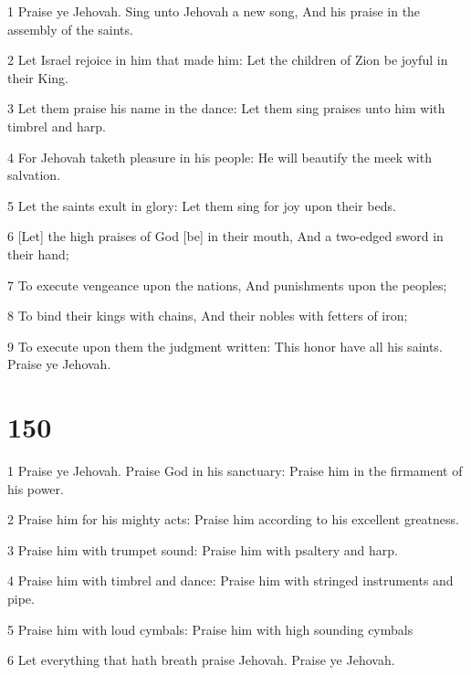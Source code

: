 \par 1 Praise ye Jehovah. Sing unto Jehovah a new song, And his praise in the assembly of the saints.
\par 2 Let Israel rejoice in him that made him: Let the children of Zion be joyful in their King.
\par 3 Let them praise his name in the dance: Let them sing praises unto him with timbrel and harp.
\par 4 For Jehovah taketh pleasure in his people: He will beautify the meek with salvation.
\par 5 Let the saints exult in glory: Let them sing for joy upon their beds.
\par 6 [Let] the high praises of God [be] in their mouth, And a two-edged sword in their hand;
\par 7 To execute vengeance upon the nations, And punishments upon the peoples;
\par 8 To bind their kings with chains, And their nobles with fetters of iron;
\par 9 To execute upon them the judgment written: This honor have all his saints. Praise ye Jehovah.

\chapter{150}

\par 1 Praise ye Jehovah. Praise God in his sanctuary: Praise him in the firmament of his power.
\par 2 Praise him for his mighty acts: Praise him according to his excellent greatness.
\par 3 Praise him with trumpet sound: Praise him with psaltery and harp.
\par 4 Praise him with timbrel and dance: Praise him with stringed instruments and pipe.
\par 5 Praise him with loud cymbals: Praise him with high sounding cymbals
\par 6 Let everything that hath breath praise Jehovah. Praise ye Jehovah.

